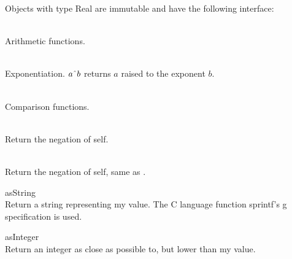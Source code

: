 \noindent Objects with type Real are immutable and have the following
interface:

\begin{desc}
  \item[\kw{function} \opd{$+$} \/\LB{}\tn{Real}\/\RB{} \returns{} \/\LB{}\tn{Real}\/\RB{}]
  \item[\kw{function} \opd{$-$} \/\LB{}\tn{Real}\/\RB{} \returns{} \/\LB{}\tn{Real}\/\RB{}]
  \item[\kw{function} \opd{$*$} \/\LB{}\tn{Real}\/\RB{} \returns{} \/\LB{}\tn{Real}\/\RB{}]
  \item[\kw{function} \opd{$/$} \/\LB{}\tn{Real}\/\RB{} \returns{} \/\LB{}\tn{Real}\/\RB{}]~\\
  Arithmetic functions.
  \item[\kw{function} \opd{$\myuparrow$} \/\LB{}\tn{Real}\/\RB{} \returns{} \/\LB{}\tn{Real}\/\RB{}]~\\
  Exponentiation. $a \myuparrow{} b$ returns $a$ raised to the exponent $b$.
  \item[\kw{function} \opd{$>$} \/\LB{}\tn{Real}\/\RB{} \returns{} \/\LB{}\tn{Boolean}\/\RB{}]
  \item[\kw{function} \opd{$>=$} \/\LB{}\tn{Real}\/\RB{} \returns{} \/\LB{}\tn{Boolean}\/\RB{}]
  \item[\kw{function} \opd{$<$} \/\LB{}\tn{Real}\/\RB{} \returns{} \/\LB{}\tn{Boolean}\/\RB{}]
  \item[\kw{function} \opd{$<=$} \/\LB{}\tn{Real}\/\RB{} \returns{} \/\LB{}\tn{Boolean}\/\RB{}]
  \item[\kw{function} \opd{$=$} \/\LB{}\tn{Real}\/\RB{} \returns{} \/\LB{}\tn{Boolean}\/\RB{}]
  \item[\kw{function} \opd{$!=$} \/\LB{}\tn{Real}\/\RB{} \returns{} \/\LB{}\tn{Boolean}\/\RB{}]~\\
  Comparison functions.
  \item[\kw{function} \opd{\tt\mytilde} \returns{} \/\LB{}\tn{Real}\/\RB{}]~\\
    Return the negation of self.
  \item[\kw{function} \opd{$-$} \returns{} \/\LB{}\tn{Real}\/\RB{}]~\\
    Return the negation of self, same as {\tt\mytilde}.
  \item[\kw{function} asString \returns{} \/\LB{}\tn{String}\/\RB{}]~\\
    Return a string representing my value.  The C language function
    sprintf's \cd{}g specification is used.
  \item[\kw{function} asInteger \returns{} \/\LB{}\tn{Integer}\/\RB{}]~\\
    Return an integer as close as possible to, but lower than my value.
\end{desc}

